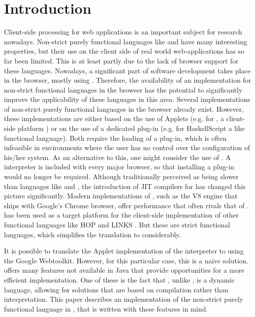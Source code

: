 \section{Introduction}\label{sapljs:sec:intro}
Client-side processing for  web applications is an important subject for research nowadays.
Non-strict purely functional languages like \Haskell %
and \Clean %
have many interesting properties, but their use on the client side of real world web-applications 
has so far been limited. 
This is at least partly due to the lack of browser support for these languages.
Nowadays, a significant part of software development takes place in the browser, mostly 
using \JavaScript. 
Therefore, the availability of an implementation for non-strict functional languages 
in the browser has the potential to significantly 
improve the applicability of these languages in this area.
Several implementations of non-strict purely functional languages in the browser already exist. 
However, these implementations are either based on the use of \Java Applets 
(e.g. for \Sapl, a client-side \Clean platform  \cite{JKP,PJKA} )
or on the use of a dedicated plug-in 
(e.g. for \textsf{HaskellScript} \cite{HaskellScript} a \Haskell like functional language).
Both require the loading of a plug-in, which is often infeasible in environments where the user has no 
control over the 
configuration of his/her system. As an alternative to this, one might consider the use of \JavaScript. 
A \JavaScript interpreter is included with every major browser, so that installing a plug-in would no longer be required. 
Although traditionally perceived as being slower than languages like \Java and \C, the introduction of JIT compilers for \JavaScript has changed this picture significantly. 
Modern implementations of \JavaScript, such as the V8 engine that ships with Google's Chrome browser, offer performance that often rivals that of \Java.
\JavaScript has been used as a target platform for the client-side implementation of other functional languages like HOP and LINKS \cite{HOP1,HOP2,LINKS1}. But these are strict functional languages, which simplifies the translation to \JavaScript considerably.

It is possible to translate the \Java Applet implementation of the \Sapl interpreter to \JavaScript 
using the Google Webtoolkit. 
However, for this particular case, this is a naive solution. \JavaScript offers many features not available in Java that provide opportunities for a more efficient implementation. One of these is the fact that \JavaScript, unlike \Java, is a dynamic language, allowing for solutions that are based on compilation rather than interpretation. This paper describes an implementation of the non-strict purely functional language \Sapl in \JavaScript, that is written with these features in mind.

